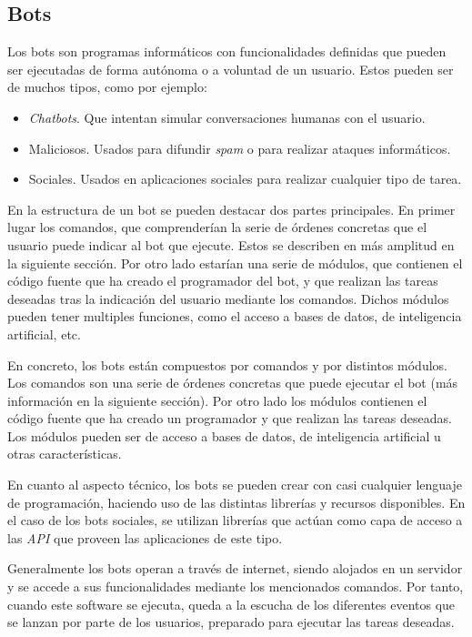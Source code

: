 \subsection{Bots}

Los bots son programas informáticos con funcionalidades definidas que pueden ser ejecutadas de forma autónoma o a voluntad de un usuario. Estos pueden ser de muchos tipos, como por ejemplo:

\begin{itemize}
	\item \textit{Chatbots}. Que intentan simular conversaciones humanas con el usuario.
	\item Maliciosos. Usados para difundir \textit{spam} o para realizar ataques informáticos.
	\item Sociales. Usados en aplicaciones sociales para realizar cualquier tipo de tarea.
\end{itemize}

En la estructura de un bot se pueden destacar dos partes principales. En primer lugar los comandos, que comprenderían la serie de órdenes concretas que el usuario puede indicar al bot que ejecute. Estos se describen en más amplitud en la siguiente sección. Por otro lado estarían una serie de módulos, que contienen el código fuente que ha creado el programador del bot, y que realizan las tareas deseadas tras la indicación del usuario mediante los comandos. Dichos módulos pueden tener multiples funciones, como el acceso a bases de datos, de inteligencia artificial, etc.

En concreto, los bots están compuestos por comandos y por distintos módulos. Los comandos son una serie de órdenes concretas que puede ejecutar el bot (más información en la siguiente sección). Por otro lado los módulos contienen el código fuente que ha creado un programador y que realizan las tareas deseadas. Los módulos pueden ser de acceso a bases de datos, de inteligencia artificial u otras características.

En cuanto al aspecto técnico, los bots se pueden crear con casi cualquier lenguaje de programación, haciendo uso de las distintas librerías y recursos disponibles. En el caso de los bots sociales, se utilizan librerías que actúan como capa de acceso a las \textit{API} que proveen las aplicaciones de este tipo.

Generalmente los bots operan a través de internet, siendo alojados en un servidor y se accede a sus funcionalidades mediante los mencionados comandos. Por tanto, cuando este software se ejecuta, queda a la escucha de los diferentes eventos que se lanzan por parte de los usuarios, preparado para ejecutar las tareas deseadas.

